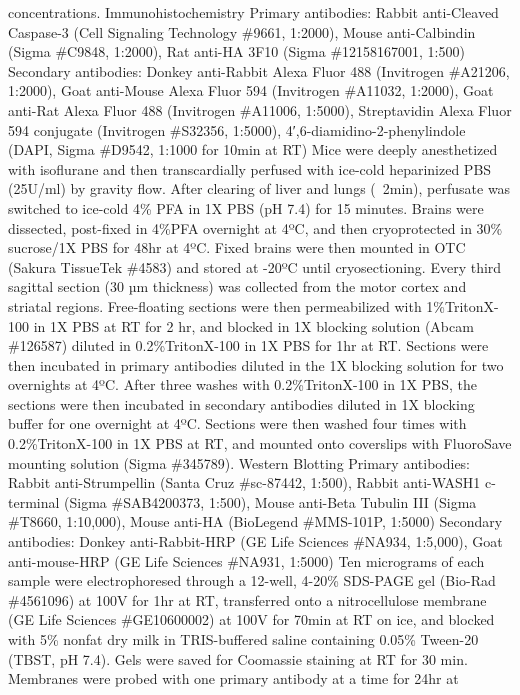 concentrations. 
Immunohistochemistry
Primary antibodies: Rabbit anti-Cleaved Caspase-3 (Cell Signaling Technology
\#9661, 1:2000), Mouse anti-Calbindin (Sigma \#C9848, 1:2000), Rat anti-HA 3F10
(Sigma \#12158167001, 1:500)
Secondary antibodies: Donkey anti-Rabbit Alexa Fluor 488 (Invitrogen \#A21206,
1:2000), Goat anti-Mouse Alexa Fluor 594 (Invitrogen \#A11032, 1:2000), Goat
anti-Rat Alexa Fluor 488 (Invitrogen \#A11006, 1:5000), Streptavidin Alexa Fluor
594 conjugate (Invitrogen \#S32356, 1:5000), 4′,6-diamidino-2-phenylindole (DAPI,
Sigma \#D9542, 1:1000 for 10min at RT)
Mice were deeply anesthetized with isoflurane and then transcardially perfused
with ice-cold heparinized PBS (25U/ml) by gravity flow. After clearing of liver
and lungs (~2min), perfusate was switched to ice-cold 4\% PFA in 1X PBS (pH 7.4)
for 15 minutes. Brains were dissected, post-fixed in 4\%PFA overnight at 4ºC, and
then cryoprotected in 30\% sucrose/1X PBS for 48hr at 4ºC. Fixed brains were then
mounted in OTC (Sakura TissueTek \#4583) and stored at -20ºC until
cryosectioning. Every third sagittal section (30 µm thickness) was collected
from the motor cortex and striatal regions. Free-floating sections were then
permeabilized with 1\%TritonX-100 in 1X PBS at RT for 2 hr, and blocked in 1X
blocking solution (Abcam \#126587) diluted in 0.2\%TritonX-100 in 1X PBS for 1hr
at RT. Sections were then incubated in primary antibodies diluted in the 1X
blocking solution for two overnights at 4ºC. After three washes with
0.2\%TritonX-100 in 1X PBS, the sections were then incubated in secondary
antibodies diluted in 1X blocking buffer for one overnight at 4ºC. Sections were
then washed four times with 0.2\%TritonX-100 in 1X PBS at RT, and mounted onto
coverslips with FluoroSave mounting solution (Sigma \#345789). 
Western Blotting
Primary antibodies: Rabbit anti-Strumpellin (Santa Cruz \#sc-87442, 1:500),
Rabbit anti-WASH1 c-terminal (Sigma \#SAB4200373, 1:500), Mouse anti-Beta Tubulin
III (Sigma \#T8660, 1:10,000), Mouse anti-HA (BioLegend \#MMS-101P, 1:5000)
Secondary antibodies: Donkey anti-Rabbit-HRP (GE Life Sciences \#NA934, 1:5,000),
Goat anti-mouse-HRP (GE Life Sciences \#NA931, 1:5000)
Ten micrograms of each sample were electrophoresed through a 12-well, 4-20\%
SDS-PAGE gel (Bio-Rad \#4561096) at 100V for 1hr at RT, transferred onto a
nitrocellulose membrane (GE Life Sciences \#GE10600002) at 100V for 70min at RT
on ice, and blocked with 5\% nonfat dry milk in TRIS-buffered saline containing
0.05\% Tween-20 (TBST, pH 7.4). Gels were saved for Coomassie staining at RT for
30 min. Membranes were probed with one primary antibody at a time for 24hr at
